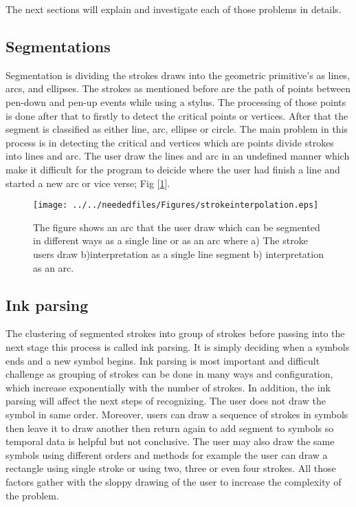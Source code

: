 The next sections will explain and investigate each of those problems in details.

\subsection{Segmentations}
\label{sec:Segmentations}

Segmentation is dividing the strokes draws into the geometric primitive's as lines, arcs, and ellipses. The strokes as mentioned before are the path of points between pen-down and pen-up events while using a stylus. The processing of those points is done after that to firstly to detect the critical points or vertices. After that the segment is classified as either line, arc, ellipse or circle. The main problem in this process is in detecting the critical and vertices which are points divide strokes into lines and arc. The user draw the lines and arc in an undefined manner which make it difficult for the program to deicide where the user had finish a line and started a new arc or vice verse; Fig [\ref {fig:strokeinterpolation}].


\begin{figure}

		\texttt{[image: ../../neededfiles/Figures/strokeinterpolation.eps]}
	\caption[Segmentation error]{The figure shows an arc that the user draw which can be segmented in different ways as a single line or as an arc where a) The stroke users draw  b)interpretation as a single line segment  b) interpretation as an arc.}
	\label{fig:strokeinterpolation}
\end{figure}



		

\subsection{Ink parsing}
\label{sec:InkParsing}

 The clustering of segmented strokes into group of strokes before passing into the next stage this process is called ink parsing. It is simply deciding when a symbols ends and a new symbol begins.  Ink parsing is most important and difficult challenge as grouping of strokes can be done in many ways and configuration, which increase exponentially with the number of strokes. In addition, the ink parsing will affect the next steps of recognizing. The user does not draw the symbol in same order. Moreover, users can draw a sequence of strokes in symbols then leave it to draw another then return again to add segment to symbols so temporal data is helpful but not conclusive.  The user may also draw the same symbols using different orders and methods for example the user can draw a rectangle using single stroke or using two, three or even four strokes. All those factors gather with the sloppy drawing of the user to increase the complexity of the problem.

